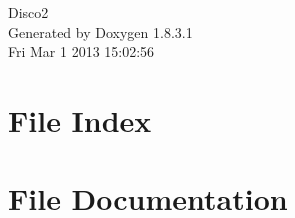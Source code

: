 \documentclass{book}
\begin{document}
\hypersetup{pageanchor=false,citecolor=blue}
\begin{titlepage}
\vspace*{7cm}
\begin{center}
{\Large Disco2 }\\
\vspace*{1cm}
{\large Generated by Doxygen 1.8.3.1}\\
\vspace*{0.5cm}
{\small Fri Mar 1 2013 15:02:56}\\
\end{center}
\end{titlepage}
\clearemptydoublepage
{}
\tableofcontents
\clearemptydoublepage
{}
\hypersetup{pageanchor=true,citecolor=blue}
\chapter{File Index}

\chapter{File Documentation}










































\printindex
\end{document}
